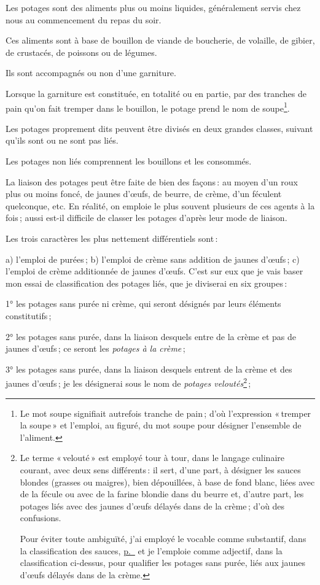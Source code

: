 \label{pg0096} \hypertarget{p0096}{}
Les potages sont des aliments plus ou moins liquides, généralement servis chez
nous au commencement du repas du soir.

Ces aliments sont à base de bouillon de viande de boucherie, de volaille, de
gibier, de crustacés, de poissons ou de légumes.

Ils sont accompagnés ou non d'une garniture.

Lorsque la garniture est constituée, en totalité ou en partie, par des tranches
de pain qu'on fait tremper dans le bouillon, le potage prend le nom de
soupe\footnote{Le mot soupe signifiait autrefois tranche de pain ; d'où
l'expression « tremper la soupe » et l'emploi, au figuré, du mot soupe pour
désigner l'ensemble de l'aliment.}.

Les potages proprement dits peuvent être divisés en deux grandes classes,
suivant qu'ils sont ou ne sont pas liés.

Les potages non liés comprennent les bouillons et les consommés.

La liaison des potages peut être faite de bien des façons : au moyen d'un roux
plus ou moins foncé, de jaunes d'œufs, de beurre, de crème, d'un féculent
quelconque, etc. En réalité, on emploie le plus souvent plusieurs de ces agents
à la fois ; aussi est-il difficile de classer les potages d'après leur mode de
liaison.

Les trois caractères les plus nettement différentiels sont :

a) l'emploi de purées ; b) l'emploi de crème sans addition de jaunes d'œufs ;
c) l'emploi de crème additionnée de jaunes d'œufs. C’est sur eux que je vais baser
mon essai de classification des potages liés, que je diviserai en six groupes :

1° les potages sans purée ni crème, qui seront désignés par leurs éléments
constitutifs ;

2° les potages sans purée, dans la liaison desquels entre de la crème et pas de
jaunes d'œufs ; ce seront les \textit{potages à la crème} ;

3° les potages sans purée, dans la liaison desquels entrent de la crème et des
jaunes d'œufs ; je les désignerai sous le nom de \textit{potages
veloutés}\footnote{Le terme « velouté » est employé tour à tour, dans le
langage culinaire courant, avec deux sens différents : il sert, d'une part,
à désigner les sauces blondes (grasses ou maigres), bien dépouillées, à base de
fond blanc, liées avec de la fécule ou avec de la farine blondie dans du beurre
et, d'autre part, les potages liés avec des jaunes d'œufs délayés dans de la
crème ; d'où des confusions.

Pour éviter toute ambiguïté, j'ai employé le vocable comme substantif, dans la
classification des sauces, \hyperlink{p0096}{p. \pageref{pg0096}} et je l'emploie comme
adjectif, dans la classification ci-dessus, pour qualifier les potages sans
purée, liés aux jaunes d'œufs délayés dans de la crème.} ;

